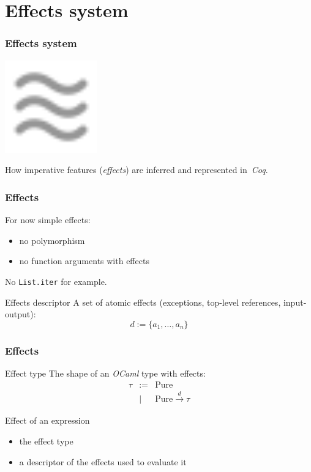\documentclass[hyperref={pdfpagelabels=false}]{beamer}
\begin{document}
  \section{Effects system}
  \begin{frame}
    \frametitle{Effects system}
    \begin{center}
      \includegraphics[width=4cm]{images/effects}
    \end{center}
    \begin{center}
      How imperative features (\emph{effects}) are inferred and represented in~\emph{Coq}.
    \end{center}
  \end{frame}
  \begin{frame}
    \frametitle{Effects}
    For now simple effects:
    \begin{itemize}
      \item no polymorphism
      \item no function arguments with effects
    \end{itemize}
    No \texttt{List.iter} for example.
    \begin{block}{Effects descriptor}
      A set of atomic effects (exceptions, top-level references, input-output):
      \[
        d := \{ a_1, \dots, a_n \}
      \]
    \end{block}
  \end{frame}
  \begin{frame}
    \frametitle{Effects}
    \begin{block}{Effect type}
      The shape of an \emph{OCaml} type with effects:
      \[
        \begin{array}{rcl}
          \tau &:=& \mathrm{Pure}\\
               &|& \mathrm{Pure} \xrightarrow{d} \tau
        \end{array}
      \]
    \end{block}
    \begin{block}{Effect of an expression}
      \begin{itemize}
        \item the effect type
        \item a descriptor of the effects used to evaluate it
      \end{itemize}
    \end{block}
  \end{frame}
\end{document}
